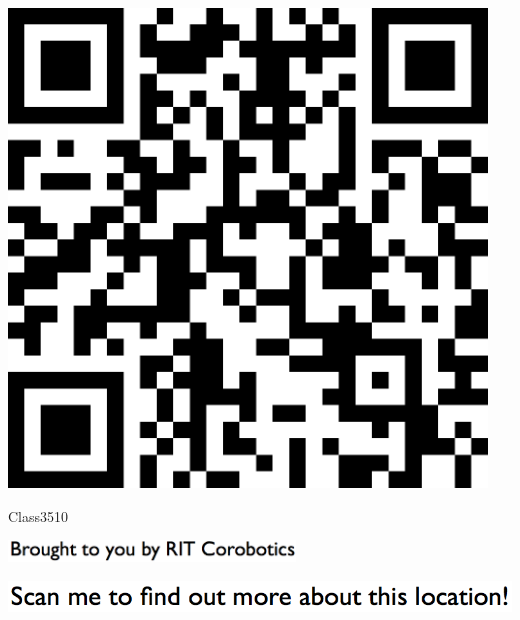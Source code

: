 \documentclass[letterpaper]{article}
\begin{document}
 \begingroup 
 \centerline{\includegraphics[scale=1,width=5in,height=5in]{Class3510.png}} 
 \endgroup 
 \vspace*{\fill} 

 \hfill{\small Class3510} 

  \vspace{0.7in} 
 
 \centerline{\includegraphics[scale=1,width=3in]{text-bottom.png}} 
 
 \pagebreak 
{} 
 \vspace*{\fill} 
 
  \centerline{\includegraphics[scale=1,width=6in]{text-top.png}} 
 
 \vspace{0.5in} 
 
\end{document}

